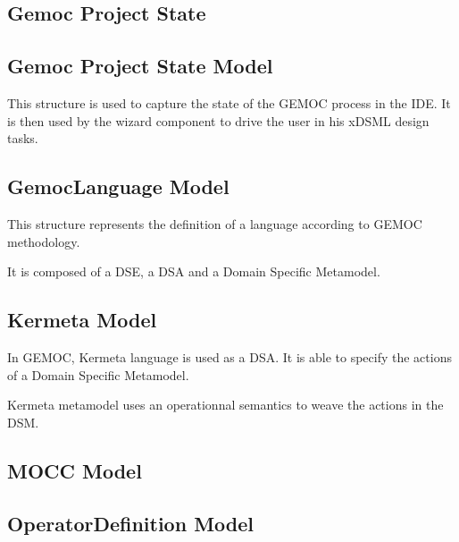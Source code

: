 \documentclass{gemoc} %
\begin{document}
\subsection{Gemoc Project State}
\label{sec:Gemoc_Project_State}


\subsection{Gemoc Project State Model}
\label{sec:Gemoc_Project_State_Model}
This structure is used to capture the state of the GEMOC process in the IDE. It is then used by the wizard component to drive the user in his xDSML design tasks.

\subsection{GemocLanguage Model}
\label{sec:GemocLanguage_Model}
This structure represents the definition of a language according to GEMOC methodology.

It is composed of a DSE, a DSA and a Domain Specific Metamodel.


\subsection{Kermeta Model}
\label{sec:Kermeta_Model}
In GEMOC, Kermeta language is used as a DSA.
It is able to specify the actions of a Domain Specific Metamodel.

Kermeta metamodel uses an operationnal semantics to weave the actions in the DSM.

\subsection{MOCC Model}
\label{sec:MOCC_Model}

\subsection{OperatorDefinition Model}
\label{sec:OperatorDefinition_Model}
\end{document}
